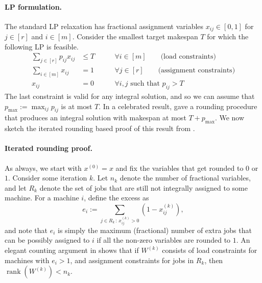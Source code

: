 \documentclass{toc}
\newcommand{\rank}{\operatorname{rank}}
\begin{document}
\paragraph{LP formulation.} The standard LP relaxation has fractional assignment variables $x_{ij} \in [0,1]$ for $j \in [r]$ and $i\in [m]$. Consider the smallest target makespan $T$ for which the following LP is feasible.
%
\begin{eqnarray*}
\sum_{j \in [r]} p_{ij} x_{ij}  & \leq  T  \qquad & \forall i \in [m]  \qquad \text{(load constraints)}\\
\sum_{i\in [m]} x_{ij}  & =  1    \qquad  & \forall j \in [r]  \qquad \text{(assignment constraints)}\\
 x_{ij} & =0 \qquad &  \forall  i,j \text{ such that }p_{ij} >T
%
\end{eqnarray*}
The last constraint is valid for any integral solution, and so we can assume that
$p_{\max}:=\max_{ij} p_{ij}$ is at most $T$.
In a celebrated result, \cite{LST} gave a rounding procedure that produces an integral solution with  makespan at most  $T + p_{\max}$.
We now  sketch the iterated rounding based proof of this result from \cite{Lau-book}.

\paragraph{Iterated rounding proof.} As always, we start with $x^{(0)}=x$ and fix the variables that get rounded to $0$ or $1$.
Consider some iteration $k$. Let $n_k$ denote the number of fractional variables, and let
 $R_k$ denote the set of jobs that are still not integrally assigned to some machine. For a machine $i$, define the excess as
\begin{equation}
\label{eq:excess} e_i:= \sum_{j \in R_k\,:\, x^{(k)}_{ij}>0} (1-x^{(k)}_{ij}),
\end{equation}
and note that
$e_i$ is simply the maximum (fractional) number of extra jobs 
that can be possibly assigned to $i$ if all the non-zero variables are rounded to $1$.
An elegant counting argument in \cite{Lau-book} shows that if $W^{(k)}$ consists of load constraints for machines with $e_i > 1$, and assignment constraints for jobs in $R_k$, then $\rank(W^{(k)}) < n_k$.
%
\end{document}
